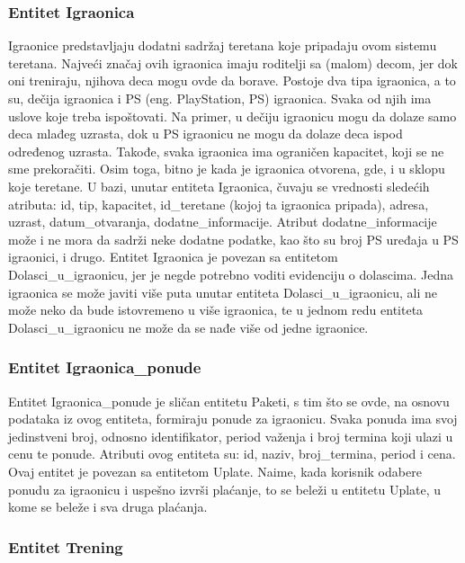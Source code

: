 \documentclass[../main.tex]{subfiles}
\begin{document}
\subsubsection{Entitet Igraonica}
Igraonice predstavljaju dodatni sadržaj teretana koje pripadaju ovom sistemu teretana. Najveći značaj ovih igraonica imaju roditelji sa (malom) decom, jer dok oni treniraju, njihova deca mogu ovde da borave. Postoje dva tipa igraonica, a to su, dečija igraonica i PS (eng. PlayStation, PS) igraonica. Svaka od njih ima uslove koje treba ispoštovati. Na primer, u dečiju igraonicu mogu da dolaze samo deca mlađeg uzrasta, dok u PS igraonicu ne mogu da dolaze deca ispod određenog uzrasta. Takođe, svaka igraonica ima ograničen kapacitet, koji se ne sme prekoračiti. Osim toga, bitno je kada je igraonica otvorena, gde, i u sklopu koje teretane.
U bazi, unutar entiteta Igraonica, čuvaju se vrednosti sledećih atributa: id, tip, kapacitet, id\_teretane (kojoj ta igraonica pripada), adresa, uzrast, datum\_otvaranja, dodatne\_informacije. Atribut dodatne\_informacije može i ne mora da sadrži neke dodatne podatke, kao što su broj PS uređaja u PS igraonici, i drugo. Entitet Igraonica je povezan sa entitetom Dolasci\_u\_igraonicu, jer je negde potrebno voditi evidenciju o dolascima. Jedna igraonica se može javiti više puta unutar entiteta Dolasci\_u\_igraonicu, ali ne može neko da bude istovremeno u više igraonica, te u jednom redu entiteta Dolasci\_u\_igraonicu ne može da se nađe više od jedne igraonice.


\subsubsection{Entitet Igraonica\_ponude}
Entitet Igraonica\_ponude je sličan entitetu Paketi, s tim što se ovde, na osnovu podataka iz ovog entiteta, formiraju ponude za igraonicu. Svaka ponuda ima svoj jedinstveni broj, odnosno identifikator, period važenja i broj termina koji ulazi u cenu te ponude. Atributi ovog entiteta su: id, naziv, broj\_termina, period i cena. Ovaj entitet je povezan sa entitetom Uplate. Naime, kada korisnik odabere ponudu za igraonicu i uspešno izvrši plaćanje, to se beleži u entitetu Uplate, u kome se beleže i sva druga plaćanja.


\subsubsection{Entitet Trening}
\end{document}
